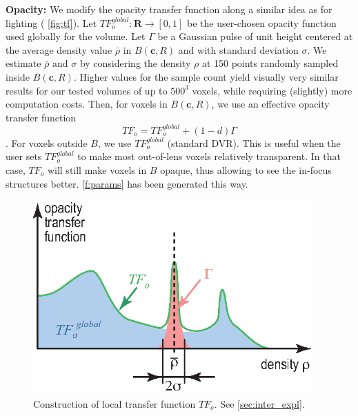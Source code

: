 \par  \textbf{Opacity:} We modify the opacity transfer function along a similar idea as for lighting ( \autoref{fig:tf}). Let $TF_{o}^{global} : \mathbf{R} \rightarrow [0,1]$ be the user-chosen opacity function used globally for the volume. Let $\Gamma$ be a Gaussian pulse of unit height centered at the average density value $\bar{\rho}$ in $B(\mathbf{c},R)$ and with standard deviation $\sigma$. We estimate $\bar{\rho}$ and $\sigma$ by considering the density $\rho$ at 150 points randomly sampled inside $B(\mathbf{c},R)$. Higher values for the sample count yield visually very similar results for our tested volumes of up to $500^3$ voxels, while requiring (slightly) more computation costs. Then, for voxels in $B(\mathbf{c},R)$, we use an effective opacity transfer function   
\begin{equation}
TF_o = TF_{o}^{global} + (1-d) \Gamma
\end{equation}.
 For voxels outside $B$, we use $TF_{o}^{global}$ (standard DVR).
This is useful when the user sets $TF_{o}^{global}$ to make most out-of-lens voxels relatively transparent. In that case, $TF_o$ will still make voxels in $B$ opaque, thus allowing to see the in-focus structures better. \autoref{f:params} has been generated this way.



\begin{figure}
\centering
\includegraphics[width=0.95\textwidth]{images/tf.eps}

\caption{Construction of local transfer function $TF_{o}$. See \autoref{sec:inter_expl}.}

\label{fig:tf}
\end{figure}


